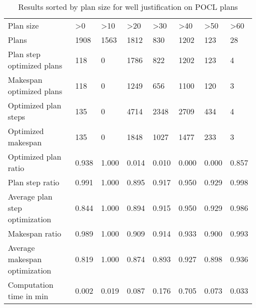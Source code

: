 \begin{table}[]
\begin{tabular}{llllllll}
\cline{1-8}
Plan size                     & \textgreater{}0 & \textgreater{}10 & \textgreater{}20 & \textgreater{}30 & \textgreater{}40 & \textgreater{}50 & \textgreater{}60 \\ \cline{1-8}
Plans                          & 1908            & 1563             & 1812             & 830              & 1202             & 123              & 28               \\
Plan step optimized plans      & 118             & 0                & 1786             & 822              & 1202             & 123              & 4                \\
Makespan optimized plans       & 118             & 0                & 1249             & 656              & 1100             & 120              & 3                \\
Optimized plan steps           & 135             & 0                & 4714             & 2348             & 2709             & 434              & 4                \\
Optimized makespan             & 135             & 0                & 1848             & 1027             & 1477             & 233              & 3                \\
Optimized plan ratio           & 0.938           & 1.000            & 0.014            & 0.010            & 0.000            & 0.000            & 0.857            \\
Plan step ratio                & 0.991           & 1.000            & 0.895            & 0.917            & 0.950            & 0.929            & 0.998            \\
Average plan step optimization & 0.844           & 1.000            & 0.894            & 0.915            & 0.950            & 0.929            & 0.986            \\
Makespan ratio                 & 0.989           & 1.000            & 0.909            & 0.914            & 0.933            & 0.900            & 0.993            \\
Average makespan optimization  & 0.819           & 1.000            & 0.874            & 0.893            & 0.927            & 0.898            & 0.936            \\
Computation time in min        & 0.002           & 0.019            & 0.087            & 0.176            & 0.705            & 0.073            & 0.033           
\end{tabular}
\caption{Results sorted by plan size for well justification on POCL plans}
\end{table}
\newpage

